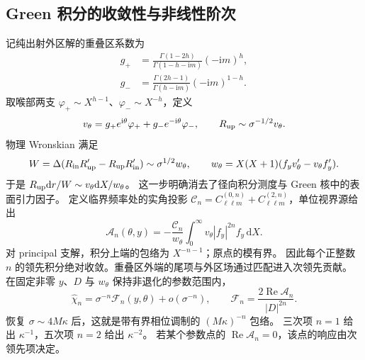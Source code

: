 \documentclass[UTF8,fontset=fandol,11pt,a4paper]{ctexart}
\newcommand{\ii}{\mathrm{i}}
\newcommand{\dd}{\mathrm{d}}
\newcommand{\Rea}{\operatorname{Re}}
\numberwithin{equation}{section}
\begin{document}
\subsection{Green 积分的收敛性与非线性阶次}
记纯出射外区解的重叠区系数为
\begin{align}
g_+&=\frac{\Gamma(1-2h)}{\Gamma(1-h-\ii m)}(-\ii m)^h,\\
g_-&=\frac{\Gamma(2h-1)}{\Gamma(h-\ii m)}(-\ii m)^{1-h}.
\end{align}
取喉部两支 $\varphi_+\sim X^{h-1}$、$\varphi_-\sim X^{-h}$，定义
\begin{equation}
v_\theta=g_+e^{\ii\theta}\varphi_++g_-e^{-\ii\theta}\varphi_-,\qquad
R_{\rm up}\sim\sigma^{-1/2}v_\theta.
\end{equation}
物理 Wronskian 满足
\begin{equation}
W=\Delta(R_{\rm in}R_{\rm up}'-R_{\rm up}R_{\rm in}')
\sim\sigma^{1/2}w_\theta,\qquad
w_\theta=X(X+1)(f_yv_\theta'-v_\theta f_y').
\end{equation}
于是 $R_{\rm up}\dd r/W\sim v_\theta\dd X/w_\theta$。
这一步明确消去了径向积分测度与 Green 核中的表面引力因子。
定义临界频率处的实角投影 $\mathcal C_n=C_{\ell\ell m}^{(0,n)}+C_{\ell\ell m}^{(2,n)}$，单位视界源给出
\begin{equation}
\mathcal A_n(\theta,y)
=-\frac{\mathcal C_n}{w_\theta}\int_0^\infty
v_\theta |f_y|^{2n}f_y\,\dd X.
\label{eq:principal-A-v2}
\end{equation}
对 principal 支解，积分上端的包络为 $X^{-n-1}$；原点的模有界。
因此每个正整数 $n$ 的领先积分绝对收敛。重叠区外端的尾项与外区场通过匹配进入次领先贡献。
在固定非零 $y$、$D$ 与 $w_\theta$ 保持非退化的参数范围内，
\begin{equation}
\boxed{\widehat\chi_n
=\sigma^{-n}\mathcal F_n(y,\theta)+o(\sigma^{-n}),\qquad
\mathcal F_n=\frac{2\Rea\mathcal A_n}{|D|^{2n}}.}
\label{eq:principal-envelope-v2}
\end{equation}
恢复 $\sigma\sim4M\kappa$ 后，这就是带有界相位调制的 $(M\kappa)^{-n}$ 包络。
三次项 $n=1$ 给出 $\kappa^{-1}$，五次项 $n=2$ 给出 $\kappa^{-2}$。
若某个参数点的 $\Rea\mathcal A_n=0$，该点的响应由次领先项决定。
\end{document}
